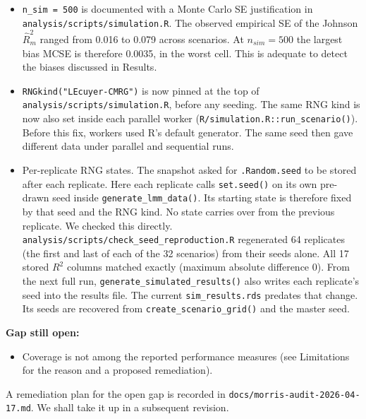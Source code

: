 \documentclass[
  11pt,
]{article}
\providecommand{\tightlist}{%
  \setlength{\itemsep}{0pt}\setlength{\parskip}{0pt}}
\begin{document}
\begin{itemize}
\tightlist
\item
  \texttt{n\_sim\ =\ 500} is documented with a Monte Carlo SE justification
  in \texttt{analysis/scripts/simulation.R}. The observed empirical SE
  of the Johnson \(\hat R^2_m\) ranged from
  0.016 to
  0.079 across
  scenarios. At \(n_{sim} = 500\) the largest bias MCSE is therefore
  0.0035, in the
  worst cell. This is adequate to detect the biases discussed in
  Results.
\item
  \texttt{RNGkind("L\textquotesingle{}Ecuyer-CMRG")} is now pinned at the top of
  \texttt{analysis/scripts/simulation.R}, before any seeding. The same
  RNG kind is now also set inside each parallel worker
  (\texttt{R/simulation.R::run\_scenario()}). Before this fix, workers
  used R's default generator. The same seed then gave different
  data under parallel and sequential runs.
\item
  Per-replicate RNG states. The snapshot asked for \texttt{.Random.seed}
  to be stored after each replicate. Here each replicate calls
  \texttt{set.seed()} on its own pre-drawn seed inside
  \texttt{generate\_lmm\_data()}. Its starting state is therefore fixed by
  that seed and the RNG kind. No state carries over from the
  previous replicate. We checked this directly.
  \texttt{analysis/scripts/check\_seed\_reproduction.R} regenerated
  64 replicates (the first and last of
  each of the 32 scenarios) from their
  seeds alone. All 17 stored \(R^2\) columns
  matched exactly (maximum absolute difference
  0). From the
  next full run, \texttt{generate\_simulated\_results()} also writes each
  replicate's seed into the results file. The current
  \texttt{sim\_results.rds} predates that change. Its seeds are recovered
  from \texttt{create\_scenario\_grid()} and the master seed.
\end{itemize}

\textbf{Gap still open:}

\begin{itemize}
\tightlist
\item
  Coverage is not among the reported performance measures (see
  Limitations for the reason and a proposed remediation).
\end{itemize}

A remediation plan for the open gap is recorded in
\texttt{docs/morris-audit-2026-04-17.md}. We shall take it up in a
subsequent revision.
\end{document}
